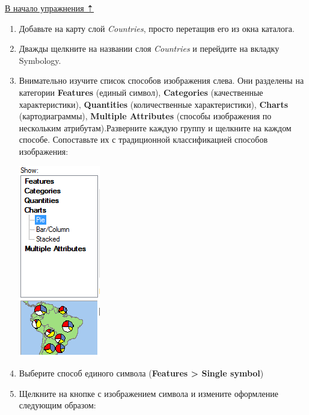 \documentclass[]{book}
\theoremstyle{definition}
\theoremstyle{definition}
\theoremstyle{definition}
\theoremstyle{remark}
\begin{document}
\protect\hyperlink{map-design-climates}{В начало упражнения ⇡}

\begin{enumerate}
\def\labelenumi{\arabic{enumi}.}
\item
  Добавьте на карту слой \emph{Countries}, просто перетащив его из окна
  каталога.
\item
  Дважды щелкните на названии слоя \emph{Countries} и перейдите на
  вкладку Symbology.
\item
  Внимательно изучите список способов изображения слева. Они разделены
  на категории \textbf{Features} (единый символ), \textbf{Categories}
  (качественные характеристики), \textbf{Quantities} (количественные
  характеристики), \textbf{Charts} (картодиаграммы), \textbf{Multiple
  Attributes} (способы изображения по нескольким атрибутам).Разверните
  каждую группу и щелкните на каждом способе. Сопоставьте их с
  традиционной классификацией способов изображения:

  \includegraphics{images/Ex01/image12.png}
\item
  Выберите способ единого символа (\textbf{Features \textgreater{}
  Single symbol})
\item
  Щелкните на кнопке с изображением символа и измените оформление
  следующим образом:


\end{enumerate}
\end{document}
